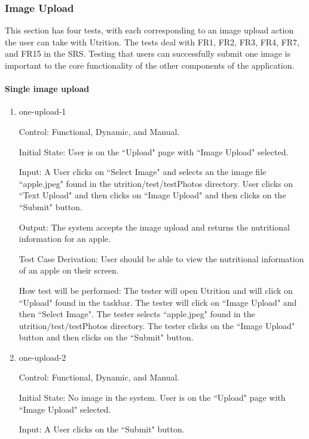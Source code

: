 \documentclass[12pt, titlepage]{article}
\begin{document}
	\subsubsection{Image Upload}
	This section has four tests, with each corresponding to an image upload action the user can take with Utrition. The tests deal with FR1, FR2, FR3, FR4, FR7, and FR15 in the SRS. 
	Testing that users can successfully submit one image is 
	important to the core functionality of the other components of the 
	application.
	
	\paragraph{Single image upload}
	
	\begin{enumerate}
		
		\item{one-upload-1\\}
		
		Control: Functional, Dynamic, and Manual.
		
		Initial State: User is on the ``Upload" page with ``Image Upload" selected.
		
		Input: A User clicks on ``Select Image" and selects an the image file ``apple.jpeg" found in the utrition/test/testPhotos directory. User clicks on ``Text Upload" and then clicks on ``Image Upload" and then clicks on the ``Submit" button.
		
		Output: The system accepts the image upload and returns the nutritional information for an apple. 
		
		Test Case Derivation: User should be able to view the nutritional information of an apple on their screen.
		
		How test will be performed: The tester will open Utrition and will click on ``Upload" found in the taskbar. The tester will click on ``Image Upload" and then ``Select Image". The tester selects ``apple.jpeg" found in the utrition/test/testPhotos directory. The tester clicks on the ``Image Upload" button and then clicks on the ``Submit" button.
		
		\item{one-upload-2\\}
		
		Control: Functional, Dynamic, and Manual.
		
		Initial State: No image in the system. User is on the ``Upload" page with ``Image Upload" selected.
		
		Input: A User clicks on the ``Submit" button.
		

\end{enumerate}
\end{document}
